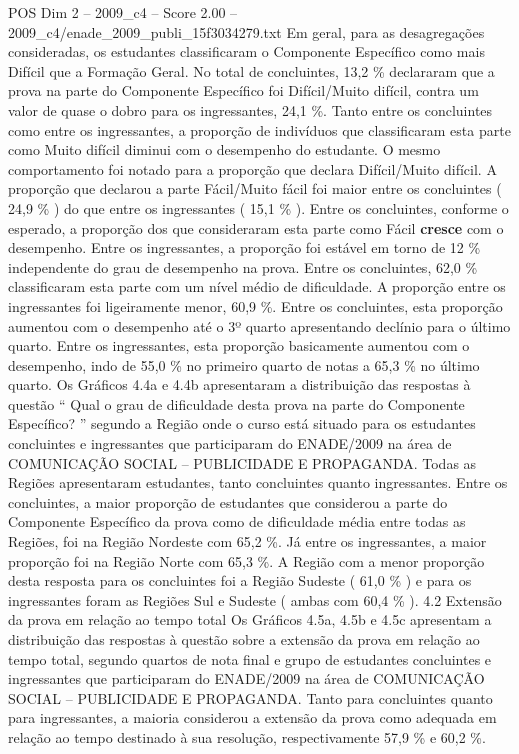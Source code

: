 \begin{textsample}{POS Dim 2 – 2009\_c4 – Score 2.00 – 2009\_c4/enade\_2009\_publi\_15f3034279.txt}
Em geral, para as desagregações consideradas, os estudantes classificaram o Componente Específico como mais Difícil que a Formação Geral.
No total de concluintes, 13,2 \% declararam que a prova na parte do Componente Específico foi Difícil/Muito difícil, contra um valor de quase o dobro para os ingressantes, 24,1 \%.
Tanto entre os concluintes como entre os ingressantes, a proporção de indivíduos que classificaram esta parte como Muito difícil diminui com o desempenho do estudante.
O mesmo comportamento foi notado para a proporção que declara Difícil/Muito difícil.
A proporção que declarou a parte Fácil/Muito fácil foi maior entre os concluintes ( 24,9 \% ) do que entre os ingressantes ( 15,1 \% ).
Entre os concluintes, conforme o esperado, a proporção dos que consideraram esta parte como Fácil \textbf{cresce} com o desempenho.
Entre os ingressantes, a proporção foi estável em torno de 12 \% independente do grau de desempenho na prova.
Entre os concluintes, 62,0 \% classificaram esta parte com um nível médio de dificuldade.
A proporção entre os ingressantes foi ligeiramente menor, 60,9 \%.
Entre os concluintes, esta proporção aumentou com o desempenho até o 3º quarto apresentando declínio para o último quarto.
Entre os ingressantes, esta proporção basicamente aumentou com o desempenho, indo de 55,0 \% no primeiro quarto de notas a 65,3 \% no último quarto.
Os Gráficos 4.4a e 4.4b apresentaram a distribuição das respostas à questão “ Qual o grau de dificuldade desta prova na parte do Componente Específico? ” segundo a Região onde o curso está situado para os estudantes concluintes e ingressantes que participaram do ENADE/2009 na área de COMUNICAÇÃO SOCIAL – PUBLICIDADE E PROPAGANDA.
Todas as Regiões apresentaram estudantes, tanto concluintes quanto ingressantes.
Entre os concluintes, a maior proporção de estudantes que considerou a parte do Componente Específico da prova como de dificuldade média entre todas as Regiões, foi na Região Nordeste com 65,2 \%.
Já entre os ingressantes, a maior proporção foi na Região Norte com 65,3 \%.
A Região com a menor proporção desta resposta para os concluintes foi a Região Sudeste ( 61,0 \% ) e para os ingressantes foram as Regiões Sul e Sudeste ( ambas com 60,4 \% ). 4.2 Extensão da prova em relação ao tempo total Os Gráficos 4.5a, 4.5b e 4.5c apresentam a distribuição das respostas à questão sobre a extensão da prova em relação ao tempo total, segundo quartos de nota final e grupo de estudantes concluintes e ingressantes que participaram do ENADE/2009 na área de COMUNICAÇÃO SOCIAL – PUBLICIDADE E PROPAGANDA.
Tanto para concluintes quanto para ingressantes, a maioria considerou a extensão da prova como adequada em relação ao tempo destinado à sua resolução, respectivamente 57,9 \% e 60,2 \%.

\end{textsample}
